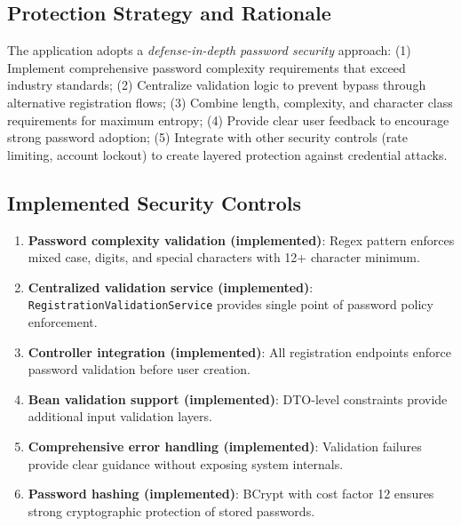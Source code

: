 \documentclass[]{UCD_CS_FYP_Report}
\begin{document}
\subsection{Protection Strategy and Rationale}
The application adopts a \textit{defense-in-depth password security} approach: (1) Implement comprehensive password complexity requirements that exceed industry standards; (2) Centralize validation logic to prevent bypass through alternative registration flows; (3) Combine length, complexity, and character class requirements for maximum entropy; (4) Provide clear user feedback to encourage strong password adoption; (5) Integrate with other security controls (rate limiting, account lockout) to create layered protection against credential attacks.

\subsection{Implemented Security Controls}
\begin{enumerate}
	\item \textbf{Password complexity validation (implemented)}: Regex pattern enforces mixed case, digits, and special characters with 12+ character minimum.
	\item \textbf{Centralized validation service (implemented)}: \texttt{RegistrationValidationService} provides single point of password policy enforcement.
	\item \textbf{Controller integration (implemented)}: All registration endpoints enforce password validation before user creation.
	\item \textbf{Bean validation support (implemented)}: DTO-level constraints provide additional input validation layers.
	\item \textbf{Comprehensive error handling (implemented)}: Validation failures provide clear guidance without exposing system internals.
	\item \textbf{Password hashing (implemented)}: BCrypt with cost factor 12 ensures strong cryptographic protection of stored passwords.
\end{enumerate}
\end{document}
